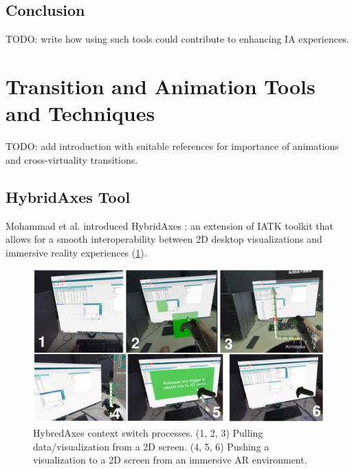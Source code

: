 \documentclass{vgtc}                          %
\begin{document}
\subsection{Conclusion}
TODO: write how using such tools could contribute to enhancing IA experiences.
\section{Transition and Animation Tools and Techniques}
TODO: add introduction with suitable references for importance of animations
and cross-virtuality transitions.
\subsection{HybridAxes Tool}
Mohammad et al. introduced HybridAxes \cite{hybridaxes_tool}; an extension of
IATK toolkit that allows for a smooth interoperability between 2D desktop
visualizations and immersive reality experiences (\cref{fig:hybridaxes}).

\medskip

\begin{figure}[tb]
	\centering
	\includegraphics[width=\columnwidth]{hybridaxes}
	\caption[Caption for RagRug]{HybredAxes context switch processes. (1, 2, 3)
		Pulling data/visualization from a 2D screen. (4, 5, 6) Pushing a
		visualization to a 2D screen from an immersive AR environment.}
	\label{fig:hybridaxes}
\end{figure}
\end{document}
